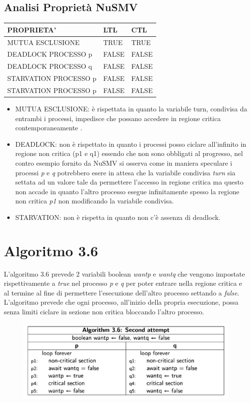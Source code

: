 \documentclass{article}
\begin{document}
\subsection{Analisi Proprietà NuSMV}
\begin{tabular}{ |p{6cm}||p{3cm}|p{3cm}|}
 \hline
 PROPRIETA' & LTL & CTL\\
 \hline
 MUTUA ESCLUSIONE&TRUE&TRUE \\
 DEADLOCK PROCESSO p&FALSE&FALSE \\
 DEADLOCK PROCESSO q&FALSE&FALSE \\
 STARVATION PROCESSO p&FALSE&FALSE\\
 STARVATION PROCESSO p&FALSE&FALSE\\
\hline
\end{tabular}
\begin{itemize}
    \item MUTUA ESCLUSIONE: è rispettata in quanto la variabile turn, condivisa da entrambi i processi, impedisce che possano accedere in regione critica contemporaneamente .
    \item DEADLOCK: non è rispettato in quanto i processi posso ciclare all'infinito in regione non critica (p1 e q1) essendo che non sono obbligati al progresso, nel contro esempio fornito da NuSMV si osserva come in maniera speculare i processi \textit{p} e \textit{q} potrebbero esere in attesa che la variabile condivisa \textit{turn} sia settata ad un valore tale da permettere l'accesso in regione critica ma questo non accade in quanto l'altro processo esegue infinitamente spesso la regione non critica \textit{p1} non modificando la variabile condivisa.
    \item STARVATION: non è rispetta in quanto non c'è assenza di deadlock.
\end{itemize}
\clearpage
\section{Algoritmo 3.6}     
L'algoritmo 3.6 prevede 2 variabili boolean \textit{wantp} e \textit{wantq} che vengono impostate rispettivamente a \textit{true} nel processo \textit{p} e \textit{q} per poter entrare nella regione critica e al termine al fine di permettere l'esecuzione dell'altro processo settando a \textit{false}. L'algoritmo prevede che ogni processo, all'inizio della propria esecuzione, possa senza limiti ciclare in sezione non critica bloccando l'altro processo. 
\begin{figure}[h] 
\centering
\includegraphics[scale=0.6]{3.6.png}
\end{figure}
\clearpage
\end{document}
